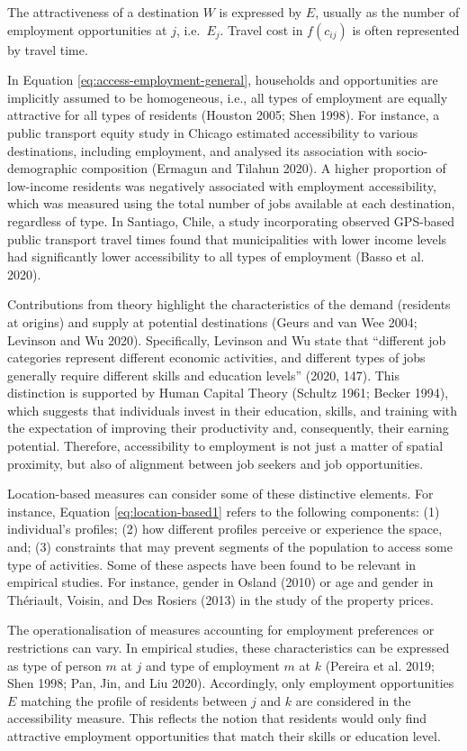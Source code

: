 \documentclass{article}
\begin{document}
The attractiveness of a destination \(W\) is expressed by \(E\), usually
as the number of employment opportunities at \(j\), i.e.~\(E_j\). Travel
cost in \(f(c_{ij})\) is often represented by travel time.

In Equation \ref{eq:access-employment-general}, households and
opportunities are implicitly assumed to be homogeneous, i.e., all types
of employment are equally attractive for all types of residents (Houston
2005; Shen 1998). For instance, a public transport equity study in
Chicago estimated accessibility to various destinations, including
employment, and analysed its association with socio-demographic
composition (Ermagun and Tilahun 2020). A higher proportion of
low-income residents was negatively associated with employment
accessibility, which was measured using the total number of jobs
available at each destination, regardless of type. In Santiago, Chile, a
study incorporating observed GPS-based public transport travel times
found that municipalities with lower income levels had significantly
lower accessibility to all types of employment (Basso et al. 2020).

Contributions from theory highlight the characteristics of the demand
(residents at origins) and supply at potential destinations (Geurs and
van Wee 2004; Levinson and Wu 2020). Specifically, Levinson and Wu state
that ``different job categories represent different economic activities,
and different types of jobs generally require different skills and
education levels'' (2020, 147). This distinction is supported by Human
Capital Theory (Schultz 1961; Becker 1994), which suggests that
individuals invest in their education, skills, and training with the
expectation of improving their productivity and, consequently, their
earning potential. Therefore, accessibility to employment is not just a
matter of spatial proximity, but also of alignment between job seekers
and job opportunities.

Location-based measures can consider some of these distinctive elements.
For instance, Equation \ref{eq:location-based1} refers to the following
components: (1) individual's profiles; (2) how different profiles
perceive or experience the space, and; (3) constraints that may prevent
segments of the population to access some type of activities. Some of
these aspects have been found to be relevant in empirical studies. For
instance, gender in Osland (2010) or age and gender in Thériault,
Voisin, and Des Rosiers (2013) in the study of the property prices.

The operationalisation of measures accounting for employment preferences
or restrictions can vary. In empirical studies, these characteristics
can be expressed as type of person \(m\) at \(j\) and type of employment
\(m\) at \(k\) (Pereira et al. 2019; Shen 1998; Pan, Jin, and Liu 2020).
Accordingly, only employment opportunities \(E\) matching the profile of
residents between \(j\) and \(k\) are considered in the accessibility
measure. This reflects the notion that residents would only find
attractive employment opportunities that match their skills or education
level.
\end{document}
